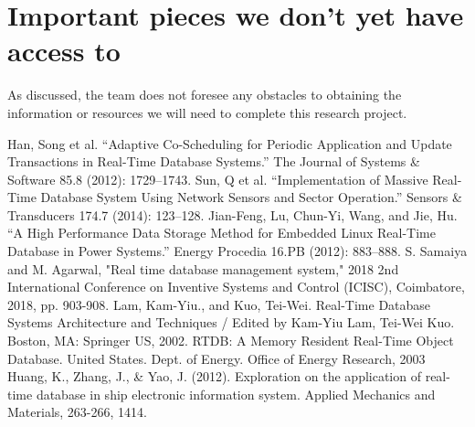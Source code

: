 \documentclass[conference]{IEEEtran}
\begin{document}
\section{Important pieces we don’t yet have access to}
As discussed, the team does not foresee any obstacles to obtaining the information or resources we will need to complete this research project.

\begin{thebibliography}{00}
 Han, Song et al. “Adaptive Co-Scheduling for Periodic Application and Update Transactions in Real-Time Database Systems.” The Journal of Systems \& Software 85.8 (2012): 1729–1743.
 Sun, Q et al. “Implementation of Massive Real-Time Database System Using Network Sensors and Sector Operation.” Sensors \& Transducers 174.7 (2014): 123–128.
 Jian-Feng, Lu, Chun-Yi, Wang, and Jie, Hu. “A High Performance Data Storage Method for Embedded Linux Real-Time Database in Power Systems.” Energy Procedia 16.PB (2012): 883–888.
 S. Samaiya and M. Agarwal, "Real time database management system," 2018 2nd International Conference on Inventive Systems and Control (ICISC), Coimbatore, 2018, pp. 903-908.
 Lam, Kam-Yiu., and Kuo, Tei-Wei. Real-Time Database Systems Architecture and Techniques / Edited by Kam-Yiu Lam, Tei-Wei Kuo. Boston, MA: Springer US, 2002. 
 RTDB: A Memory Resident Real-Time Object Database. United States. Dept. of Energy. Office of Energy Research, 2003
 Huang, K., Zhang, J., \& Yao, J. (2012). Exploration on the application of real-time database in ship electronic information system. Applied Mechanics and Materials, 263-266, 1414. 
\end{thebibliography}
\end{document}
